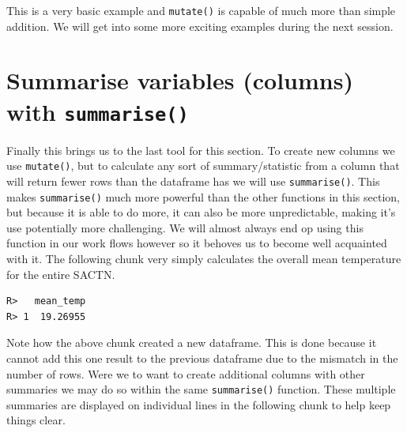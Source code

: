 \documentclass[]{book}
\newenvironment{Shaded}{\begin{snugshade}}{\end{snugshade}}
\newcommand{\KeywordTok}[1]{\textcolor[rgb]{0.13,0.29,0.53}{\textbf{#1}}}
\newcommand{\DataTypeTok}[1]{\textcolor[rgb]{0.13,0.29,0.53}{#1}}
\newcommand{\StringTok}[1]{\textcolor[rgb]{0.31,0.60,0.02}{#1}}
\newcommand{\OtherTok}[1]{\textcolor[rgb]{0.56,0.35,0.01}{#1}}
\newcommand{\OperatorTok}[1]{\textcolor[rgb]{0.81,0.36,0.00}{\textbf{#1}}}
\newcommand{\NormalTok}[1]{#1}
\theoremstyle{definition}
\theoremstyle{definition}
\theoremstyle{definition}
\theoremstyle{remark}
\begin{document}
This is a very basic example and \texttt{mutate()} is capable of much
more than simple addition. We will get into some more exciting examples
during the next session.

\section{\texorpdfstring{Summarise variables (columns) with
\texttt{summarise()}}{Summarise variables (columns) with summarise()}}\label{summarise-variables-columns-with-summarise}

Finally this brings us to the last tool for this section. To create new
columns we use \texttt{mutate()}, but to calculate any sort of
summary/statistic from a column that will return fewer rows than the
dataframe has we will use \texttt{summarise()}. This makes
\texttt{summarise()} much more powerful than the other functions in this
section, but because it is able to do more, it can also be more
unpredictable, making it's use potentially more challenging. We will
almost always end op using this function in our work flows however so it
behoves us to become well acquainted with it. The following chunk very
simply calculates the overall mean temperature for the entire SACTN.

\begin{Shaded}
\end{Shaded}

\begin{verbatim}
R>   mean_temp
R> 1  19.26955
\end{verbatim}

Note how the above chunk created a new dataframe. This is done because
it cannot add this one result to the previous dataframe due to the
mismatch in the number of rows. Were we to want to create additional
columns with other summaries we may do so within the same
\texttt{summarise()} function. These multiple summaries are displayed on
individual lines in the following chunk to help keep things clear.

\begin{Shaded}
\end{Shaded}
\end{document}
